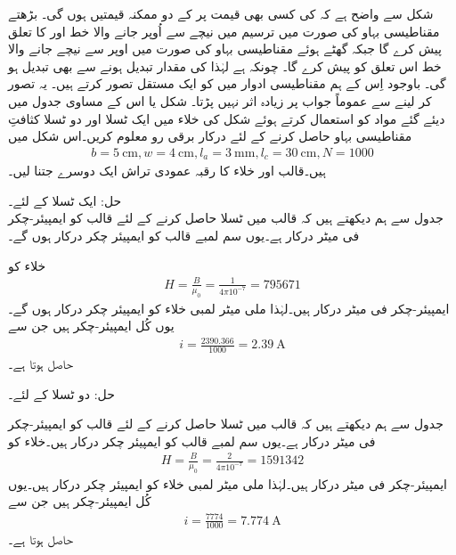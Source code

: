 شکل  سے واضح ہے کہ  کی کسی بھی قیمت پر  کے  دو ممکنہ قیمتیں ہوں گی۔ بڑھتے مقناطیسی بہاو کی صورت میں ترسیم میں نیچے سے اُوپر جانے والا خط  اور  کا تعلق پیش کرے گا جبکہ گھٹے ہوئے مقناطیسی بہاو کی صورت میں  اوپر سے نیچے جانے والا خط اس تعلق کو پیش کرے  گا۔  چونکہ  ہے  لہٰذا  کی  مقدار تبدیل ہونے سے  بھی تبدیل ہو گی۔ باوجود اِس کے ہم مقناطیسی ادوار میں   کو ایک مستقل تصور کرتے ہیں۔ یہ تصور کر لینے سے عموماً جواب پر زیادہ اثر نہیں پڑتا۔
%
شکل   یا اس کے مساوی جدول  میں دیئے گئے مواد کو استعمال کرتے ہوئے شکل   کی خلاء میں ایک ٹسلا اور دو ٹسلا کثافتِ  مقناطیسی بہاو حاصل کرنے کے لئے درکار برقی رو معلوم کریں۔اس شکل میں
\begin{align*}
b=\SI{5}{\centi\meter},w=\SI{4}{\centi\meter},l_a=\SI{3}{\milli\meter},l_c=\SI{30}{\centi\meter},N=1000
\end{align*}
ہیں۔قالب اور خلاء کا رقبہ عمودی تراش ایک دوسرے جتنا لیں۔

حل:\quad
 ایک ٹسلا کے لئے۔\\
 جدول   سے ہم دیکھتے ہیں کہ قالب میں  ٹسلا  حاصل کرنے کے لئے  قالب کو   ایمپیئر-چکر فی  میٹر  درکار ہے۔یوں  سم لمبے قالب کو   ایمپیئر چکر درکار ہوں گے۔

خلاء کو
\begin{align*}
H=\frac{B}{\mu_0}=\frac{1}{4\pi 10^{-7}}=\num{795671}
\end{align*}
ایمپیئر-چکر فی میٹر درکار ہیں۔لہٰذا  ملی میٹر لمبی خلاء کو  ایمپیئر چکر درکار ہوں گے۔یوں کُل ایمپیئر-چکر  ہیں جن سے 
\begin{align*}
i=\frac{2390.366}{1000}=\SI{2.39}{\ampere}
\end{align*}	
حاصل ہوتا ہے۔

حل: دو ٹسلا کے لئے۔

جدول  سے ہم دیکھتے ہیں کہ قالب میں  ٹسلا  حاصل کرنے کے لئے  قالب کو  ایمپیئر-چکر فی میٹر  درکار ہے۔یوں  سم لمبے قالب کو  ایمپیئر چکر درکار ہیں۔خلاء کو
\begin{align*}
H=\frac{B}{\mu_0}=\frac{2}{4\pi 10^{-7}}=\num{1591342}
\end{align*}
ایمپیئر-چکر فی میٹر درکار ہیں۔لہٰذا  ملی میٹر لمبی خلاء کو    ایمپیئر چکر درکار ہیں۔یوں کُل ایمپیئر-چکر  ہیں جن سے 
\begin{align*}
i=\frac{7774}{1000}=\SI{7.774}{\ampere}
\end{align*}
حاصل ہوتا ہے۔

